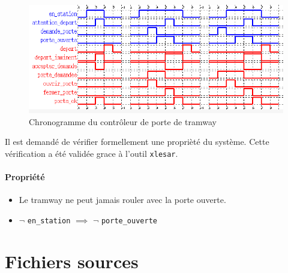 \documentclass{article}
\begin{document}
      \begin{figure}
        \centering
        \includegraphics[scale=0.5]{img/chrono1_tram.png}
        \caption{Chronogramme du contrôleur de porte de tramway}
        \label{fig:chrono1_tram}
      \end{figure}

      \medskip
      Il est demandé de vérifier formellement une proprièté du
      système. Cette vérification a été validée grace à l'outil {\tt xlesar}.

      \paragraph{Propriété}
        \begin{itemize}
          \item[] Le tramway ne peut jamais rouler avec la porte ouverte.
          \item[] \noindent
            $\lnot$ {\tt en\_station} $\implies$ $\lnot$ {\tt porte\_ouverte} \medskip
        \end{itemize}

  \appendix
  \section{Fichiers sources}
\end{document}
